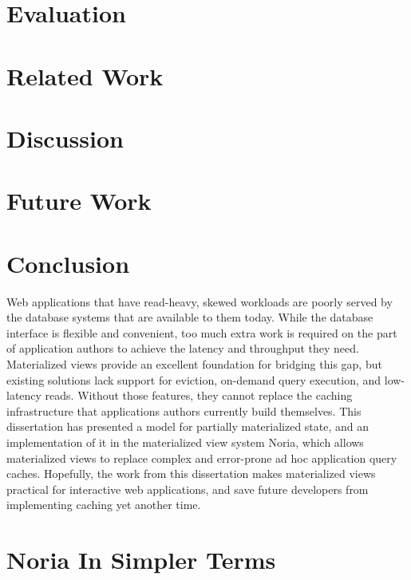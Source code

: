 \documentclass[fontsize=12pt,paper=letter,oneside,final]{scrbook}
\begin{document}


\chapter{Evaluation}
\label{s:eval}



\chapter{Related Work}
\label{s:related}



\chapter{Discussion}
\label{s:disc}



\chapter{Future Work}
\label{s:future}



\chapter{Conclusion}

Web applications that have read-heavy, skewed workloads are poorly served by
the database systems that are available to them today. While the database
interface is flexible and convenient, too much extra work is required on the
part of application authors to achieve the latency and throughput they need.
Materialized views provide an excellent foundation for bridging this gap, but
existing solutions lack support for eviction, on-demand query execution, and
low-latency reads. Without those features, they cannot replace the caching
infrastructure that applications authors currently build themselves. This
dissertation has presented a model for partially materialized state, and an
implementation of it in the materialized view system Noria, which allows
materialized views to replace complex and error-prone ad hoc application query
caches. Hopefully, the work from this dissertation makes materialized views
practical for interactive web applications, and save future developers from
implementing caching yet another time.

\appendix
\chapter{Noria In Simpler Terms}
\label{s:simple}



\backmatter

\begin{spacing}{1}
\printbibliography
\end{spacing}
\end{document}
